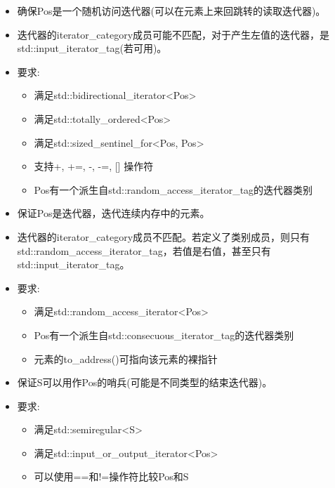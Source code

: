 \begin{itemize}
\item
确保Pos是一个随机访问迭代器(可以在元素上来回跳转的读取迭代器)。

\item
迭代器的iterator\_category成员可能不匹配，对于产生左值的迭代器，是std::input\_iterator\_tag(若可用)。

\item
要求:
\begin{itemize}
\item
满足std::bidirectional\_iterator<Pos>

\item
满足std::totally\_ordered<Pos>

\item
满足std::sized\_sentinel\_for<Pos, Pos>

\item
支持+, +=, -, -=, [] 操作符

\item
Pos有一个派生自std::random\_access\_iterator\_tag的迭代器类别
\end{itemize}
\end{itemize}


\begin{itemize}
\item
保证Pos是迭代器，迭代连续内存中的元素。

\item
迭代器的iterator\_category成员不匹配。若定义了类别成员，则只有std::random\_access\_iterator\_tag，若值是右值，甚至只有std::input\_iterator\_tag。

\item
要求:
\begin{itemize}
\item
满足std::random\_access\_iterator<Pos>

\item
Pos有一个派生自std::consecuous\_iterator\_tag的迭代器类别

\item
元素的to\_address()可指向该元素的裸指针
\end{itemize}
\end{itemize}


\begin{itemize}
\item
保证S可以用作Pos的哨兵(可能是不同类型的结束迭代器)。

\item
要求:
\begin{itemize}
\item
满足std::semiregular<S>

\item
满足std::input\_or\_output\_iterator<Pos>

\item
可以使用==和!=操作符比较Pos和S
\end{itemize}
\end{itemize}

